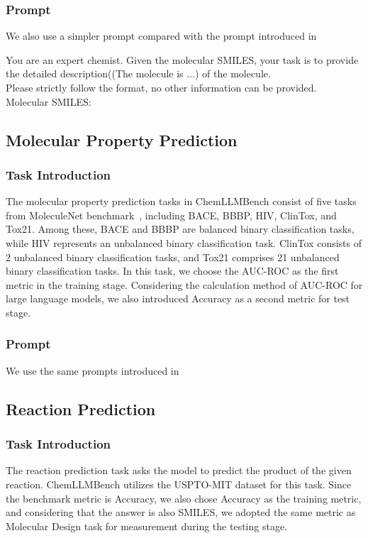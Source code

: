 \subsubsection{Prompt}
We also use a simpler prompt compared with the prompt introduced in \cite{guo2023largelanguagemodelschemistry}
\begin{tcolorbox}[colback=gray!10, colframe=black, title=Prompt: Molecule Captioning]
You are an expert chemist. Given the molecular SMILES, your task is to provide the detailed description((The molecule is ...) of the molecule. \\Please strictly follow the format, no other information can be provided.\\Molecular SMILES:
\end{tcolorbox}

\subsection{Molecular Property Prediction}
\subsubsection{Task Introduction}
The molecular property prediction tasks in ChemLLMBench consist of five tasks from MoleculeNet benchmark~\cite{wu2018moleculenetbenchmarkmolecularmachine}, including BACE, BBBP, HIV, ClinTox, and Tox21. Among these, BACE and BBBP are balanced binary classification tasks, while HIV represents an unbalanced binary classification task. ClinTox consists of 2 unbalanced binary classification tasks, and Tox21 comprises 21 unbalanced binary classification tasks. In this task, we choose the AUC-ROC as the first metric in the training stage. Considering the calculation method of AUC-ROC for large language models, we also introduced Accuracy as a second metric for test stage.
\subsubsection{Prompt}
We use the same prompts introduced in ~\cite{guo2023largelanguagemodelschemistry}

\subsection{Reaction Prediction}
\subsubsection{Task Introduction}
The reaction prediction task asks the model to predict the product of the given reaction. ChemLLMBench utilizes the USPTO-MIT dataset for this task. Since the benchmark metric is Accuracy, we also chose Accuracy as the training metric, and considering that the answer is also SMILES, we adopted the same metric as Molecular Design task for measurement during the testing stage.
